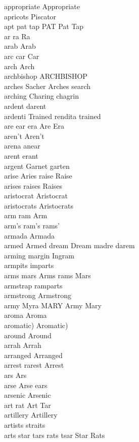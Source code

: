 appropriate Appropriate\\
apricots Piscator\\
apt pat tap PAT Pat Tap\\
ar ra Ra\\
arab Arab\\
arc car Car\\
arch Arch\\
archbishop ARCHBISHOP\\
arches Sacher Arches search\\
arching Charing chagrin\\
ardent darent\\
ardenti Trained rendita trained\\
are ear era Are Era\\
aren't Aren't\\
arena anear\\
arent erant\\
argent Garnet garten\\
arise Aries raise Raise\\
arises raises Raises\\
aristocrat Aristocrat\\
aristocrats Aristocrats\\
arm ram Arm\\
arm's ram's rams'\\
armada Armada\\
armed Armed dream Dream madre darem\\
arming margin Ingram\\
armpits imparts\\
arms mars Arms rams Mars\\
armstrap ramparts\\
armstrong Armstrong\\
army Myra MARY Army Mary\\
aroma Aroma\\
aromatic) Aromatic)\\
around Around\\
arrah Arrah\\
arranged Arranged\\
arrest rarest Arrest\\
ars Ars\\
arse Arse ears\\
arsenic Arsenic\\
art rat Art Tar\\
artillery Artillery\\
artists straits\\
arts star tars rats tsar Star Rats\\
